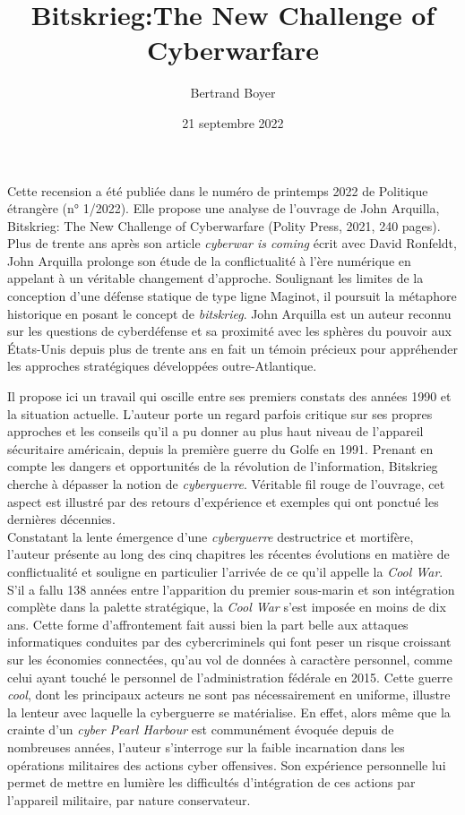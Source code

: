 \documentclass[a4paper]{article}
\title{Bitskrieg:The New Challenge of Cyberwarfare}
\author{Bertrand Boyer} %
\date{21 septembre 2022}
\begin{document}
\maketitle                 

Cette recension a été publiée dans le numéro de printemps 2022 de Politique étrangère (n° 1/2022). Elle propose une analyse de l’ouvrage de John Arquilla, Bitskrieg: The New Challenge of Cyberwarfare (Polity Press, 2021, 240 pages). 
\\

Plus de trente ans après son article \textit{cyberwar is coming} écrit avec David Ronfeldt, John Arquilla prolonge son étude de la conflictualité à l’ère numérique en appelant à un véritable changement d’approche. Soulignant les limites de la conception d’une défense statique de type ligne Maginot, il poursuit la métaphore historique en posant le concept de \textit{bitskrieg}. John Arquilla est un auteur reconnu sur les questions de cyberdéfense et sa proximité avec les sphères du pouvoir aux États-Unis depuis plus de trente ans en fait un témoin précieux pour appréhender les approches stratégiques développées outre-Atlantique.

Il propose ici un travail qui oscille entre ses premiers constats des années 1990 et la situation actuelle. L’auteur porte un regard parfois critique sur ses propres approches et les conseils qu’il a pu donner au plus haut niveau de l’appareil sécuritaire américain, depuis la première guerre du Golfe en 1991. Prenant en compte les dangers et opportunités de la révolution de l’information, Bitskrieg cherche à dépasser la notion de \textit{cyberguerre}. Véritable fil rouge de l’ouvrage, cet aspect est illustré par des retours d’expérience et exemples qui ont ponctué les dernières décennies.
\\

Constatant la lente émergence d’une \textit{cyberguerre} destructrice et mortifère, l’auteur présente au long des cinq chapitres les récentes évolutions en matière de conflictualité et souligne en particulier l’arrivée de ce qu’il appelle la \textit{Cool War}. S’il a fallu 138 années entre l’apparition du premier sous-marin et son intégration complète dans la palette stratégique, la \textit{Cool War} s’est imposée en moins de dix ans. Cette forme d’affrontement fait aussi bien la part belle aux attaques informatiques conduites par des cybercriminels qui font peser un risque croissant sur les économies connectées, qu’au vol de données à caractère personnel, comme celui ayant touché le personnel de l’administration fédérale en 2015. Cette guerre \textit{cool}, dont les principaux acteurs ne sont pas nécessairement en uniforme, illustre la lenteur avec laquelle la cyberguerre se matérialise. En effet, alors même que la crainte d’un \textit{cyber Pearl Harbour} est communément évoquée depuis de nombreuses années, l’auteur s’interroge sur la faible incarnation dans les opérations militaires des actions cyber offensives. Son expérience personnelle lui permet de mettre en lumière les difficultés d’intégration de ces actions par l’appareil militaire, par nature conservateur.
\\
\end{document}
